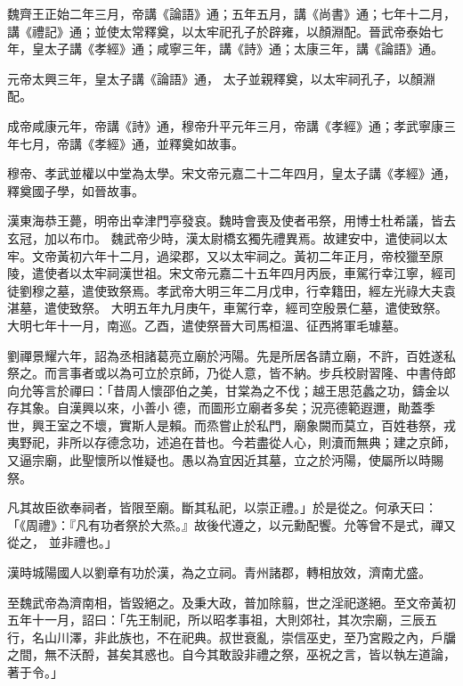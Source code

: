 \begin{pinyinscope}
 魏齊王正始二年三月，帝講《論語》通；五年五月，講《尚書》通；七年十二月，講《禮記》通；並使太常釋奠，以太牢祀孔子於辟雍，以顏淵配。晉武帝泰始七年，皇太子講《孝經》通；咸寧三年，講《詩》通；太康三年，講《論語》通。



 元帝太興三年，皇太子講《論語》通，
 太子並親釋奠，以太牢祠孔子，以顏淵配。



 成帝咸康元年，帝講《詩》通，穆帝升平元年三月，帝講《孝經》通；孝武寧康三年七月，帝講《孝經》通，並釋奠如故事。



 穆帝、孝武並權以中堂為太學。宋文帝元嘉二十二年四月，皇太子講《孝經》通，釋奠國子學，如晉故事。



 漢東海恭王薨，明帝出幸津門亭發哀。魏時會喪及使者弔祭，用博士杜希議，皆去玄冠，加以布巾。
 魏武帝少時，漢太尉橋玄獨先禮異焉。故建安中，遣使祠以太牢。文帝黃初六年十二月，過梁郡，又以太牢祠之。黃初二年正月，帝校獵至原陵，遣使者以太牢祠漢世祖。宋文帝元嘉二十五年四月丙辰，車駕行幸江寧，經司徒劉穆之墓，遣使致祭焉。孝武帝大明三年二月戊申，行幸籍田，經左光祿大夫袁湛墓，遣使致祭。
 大明五年九月庚午，車駕行幸，經司空殷景仁墓，遣使致祭。大明七年十一月，南巡。乙酉，遣使祭晉大司馬桓溫、征西將軍毛璩墓。



 劉禪景耀六年，詔為丞相諸葛亮立廟於沔陽。先是所居各請立廟，不許，百姓遂私祭之。而言事者或以為可立於京師，乃從人意，皆不納。步兵校尉習隆、中書侍郎向允等言於禪曰：「昔周人懷邵伯之美，甘棠為之不伐；越王思范蠡之功，鑄金以存其象。自漢興以來，小善小
 德，而圖形立廟者多矣；況亮德範遐邇，勛蓋季世，興王室之不壞，實斯人是賴。而烝嘗止於私門，廟象闕而莫立，百姓巷祭，戎夷野祀，非所以存德念功，述追在昔也。今若盡從人心，則瀆而無典；建之京師，又逼宗廟，此聖懷所以惟疑也。愚以為宜因近其墓，立之於沔陽，使屬所以時賜祭。



 凡其故臣欲奉祠者，皆限至廟。斷其私祀，以崇正禮。」於是從之。何承天曰：「《周禮》：『凡有功者祭於大烝。』故後代遵之，以元勳配饗。允等曾不是式，禪又從之，
 並非禮也。」



 漢時城陽國人以劉章有功於漢，為之立祠。青州諸郡，轉相放效，濟南尤盛。



 至魏武帝為濟南相，皆毀絕之。及秉大政，普加除翦，世之淫祀遂絕。至文帝黃初五年十一月，詔曰：「先王制祀，所以昭孝事祖，大則郊社，其次宗廟，三辰五行，名山川澤，非此族也，不在祀典。叔世衰亂，崇信巫史，至乃宮殿之內，戶牖之間，無不沃酹，甚矣其惑也。自今其敢設非禮之祭，巫祝之言，皆以執左道論，
 著于令。」




\end{pinyinscope}
